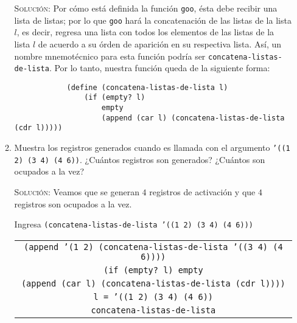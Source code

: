 \documentclass[letterpaper,11pt]{article}
\begin{document}
\begin{enumerate}
\begin{enumerate}
        \textsc{Solución:} Por cómo está definida la función \texttt{goo}, 
        ésta debe recibir una lista de listas; por lo que \texttt{goo} hará 
        la concatenación de las listas de la lista $l$, es decir, regresa una 
        lista con todos los elementos de las listas de la lista $l$ de acuerdo 
        a su órden de aparición en su respectiva lista. Así, un nombre 
        mnemotécnico para esta función podría ser 
        \texttt{concatena-listas-de-lista}. Por lo tanto, nuestra función 
        queda de la siguiente forma:
        \begin{verbatim}
            (define (concatena-listas-de-lista l)
                (if (empty? l)
                    empty
                    (append (car l) (concatena-listas-de-lista (cdr l)))))
        \end{verbatim}

        \newpage
        \item Muestra los registros generados cuando es llamada con el argumento
        \texttt{'((1 2) (3 4) (4 6))}. ¿Cuántos registros son generados? ¿Cuántos 
        son ocupados a la vez?

        \textsc{Solución:} Veamos que se generan $4$ registros de activación y
        que $4$ registros son ocupados a la vez.

        Ingresa \texttt{(concatena-listas-de-lista '((1 2) (3 4) (4 6)))}
        \begin{center}
            \begin{tabular}{|c|}
                \hline
                \texttt{(append '(1 2) 
                (concatena-listas-de-lista '((3 4) (4 6))))}  \\
                \texttt{(if (empty? l) empty} \\
                \texttt{(append (car l) (concatena-listas-de-lista (cdr l))))} \\
                \texttt{l = '((1 2) (3 4) (4 6))} \\
                \texttt{concatena-listas-de-lista} \\
                \hline
            \end{tabular}
        \end{center}


\end{enumerate}
\end{enumerate}
\end{document}
